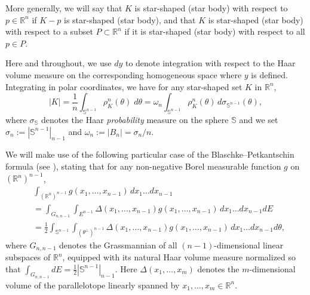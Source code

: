 \documentclass[11pt]{article}
\theoremstyle{definition}
\theoremstyle{proof}
\DeclareMathOperator{\+}{\mathop{\tilde{+}}}
\newcommand{\R}{\mathbb{R}}
\renewcommand{\S}{\mathbb{S}}
\numberwithin{equation}{section}
\numberwithin{equation}{section}
\begin{document}
More generally, we will say that $K$ is star-shaped (star body) with respect to $p \in \R^n$ if $K-p$ is star-shaped (star body), and that $K$ is star-shaped (star body) with respect to a subset $P \subset \R^n$ if it is star-shaped (star body) with respect to all $p \in P$. 


\medskip

Here and throughout, we use $dy$ to denote integration with respect to the Haar volume measure on the corresponding homogeneous space where $y$ is defined. Integrating in polar coordinates, we have for any star-shaped set $K$ in $\R^n$,
\begin{equation} \label{eq:vol-polar}
|K| = \frac{1}{n} \int_{\S^{n-1}} \rho^n_{K}(\theta) \;  d\theta = \omega_n \int_{\S^{n-1}} \rho^n_{K}(\theta) \, d\sigma_{\S^{n-1}}(\theta) , 
\end{equation}
where $\sigma_{\S}$ denotes the Haar \emph{probability} measure on the sphere $\S$ and we set $\sigma_n := |\S^{n-1}|_{n-1}$
 and $\omega_n := |B_n| = \sigma_n / n$.

\smallskip
We will make use of the following particular case of the Blaschke--Petkantschin formula (see \cite[Theorem 7.2.1]{SchneiderWeil-Book}), stating that for any non-negative Borel measurable function $g$ on $(\R^n)^{n-1}$,
\begin{align}
\nonumber & \int_{(\R^n)^{n-1}} g(x_1,\ldots,x_{n-1}) \, dx_1 \ldots dx_{n-1} \\
\nonumber & = \int_{G_{n,n-1}} \int_{E^{n-1}} \Delta(x_1,\ldots,x_{n-1}) g(x_1,\ldots,x_{n-1}) \, dx_1 \ldots dx_{n-1} dE \\
\label{eq:BP} & = \frac{1}{2} \int_{\S^{n-1}} \int_{(\theta^{\perp})^{n-1}} \Delta(x_1,\ldots,x_{n-1}) g(x_1,\ldots,x_{n-1}) \, dx_1 \ldots dx_{n-1} d\theta ,
\end{align}
where $G_{n,n-1}$ denotes the Grassmannian of all $(n-1)$-dimensional linear subspaces of $\R^n$, equipped with its natural Haar volume measure 
normalized so that $\int_{G_{n,n-1}} dE = \frac{1}{2} |\S^{n-1}|_{n-1}$.
Here $\Delta(x_1,\ldots,x_m)$ denotes the $m$-dimensional volume of the parallelotope linearly spanned by $x_1,\ldots,x_m \in \R^n$.
\end{document}
